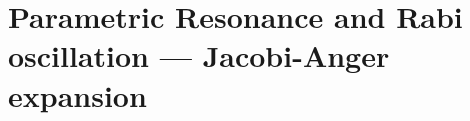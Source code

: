 \documentclass[%
reprint,
 amsmath,amssymb,
 prd,
]{revtex4-1}
\begin{document}



















\section{\label{sec:jacobi}Parametric Resonance and Rabi oscillation --- Jacobi-Anger expansion}
\end{document}
